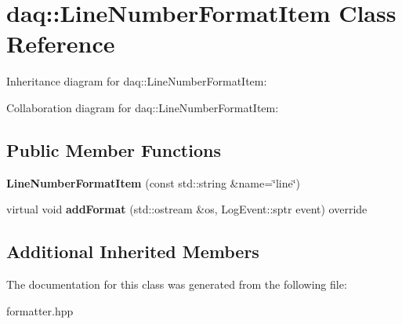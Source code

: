 \hypertarget{classdaq_1_1LineNumberFormatItem}{}\section{daq\+:\+:Line\+Number\+Format\+Item Class Reference}
\label{classdaq_1_1LineNumberFormatItem}


Inheritance diagram for daq\+:\+:Line\+Number\+Format\+Item\+:


Collaboration diagram for daq\+:\+:Line\+Number\+Format\+Item\+:
\subsection*{Public Member Functions}
\begin{DoxyCompactItemize}
\item 
\mbox{\label{classdaq_1_1LineNumberFormatItem_ae6e0b0ea97da5995beccc209660b3dbb}} 
{\bfseries Line\+Number\+Format\+Item} (const std\+::string \&name=\char`\"{}line\char`\"{})
\item 
\mbox{\label{classdaq_1_1LineNumberFormatItem_a85e060abf71e70314182cac8762354c9}} 
virtual void {\bfseries add\+Format} (std\+::ostream \&os, Log\+Event\+::sptr event) override
\end{DoxyCompactItemize}
\subsection*{Additional Inherited Members}


The documentation for this class was generated from the following file\+:\begin{DoxyCompactItemize}
\item 
formatter.\+hpp\end{DoxyCompactItemize}
